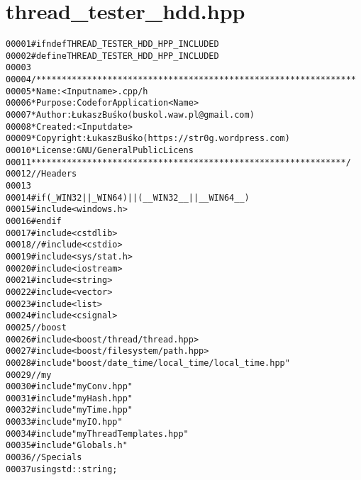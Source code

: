 \hypertarget{thread__tester__hdd_8hpp_source}{
\section{thread\_\-tester\_\-hdd.hpp}
}


\begin{footnotesize}\begin{alltt}
00001 \textcolor{preprocessor}{#ifndef THREAD\_TESTER\_HDD\_HPP\_INCLUDED}
00002 \textcolor{preprocessor}{}\textcolor{preprocessor}{#define THREAD\_TESTER\_HDD\_HPP\_INCLUDED}
00003 \textcolor{preprocessor}{}
00004 \textcolor{comment}{/***************************************************************}
00005 \textcolor{comment}{ * Name:      <Input name>.cpp/h}
00006 \textcolor{comment}{ * Purpose:   Code for Application <Name>}
00007 \textcolor{comment}{ * Author:    Łukasz Buśko (buskol.waw.pl@gmail.com)}
00008 \textcolor{comment}{ * Created:   <Input date>}
00009 \textcolor{comment}{ * Copyright: Łukasz Buśko (https://str0g.wordpress.com)}
00010 \textcolor{comment}{ * License:   GNU / General Public Licens}
00011 \textcolor{comment}{ **************************************************************/}
00012 \textcolor{comment}{//Headers}
00013 
00014 \textcolor{preprocessor}{#if ( \_WIN32 || \_WIN64 ) || ( \_\_WIN32\_\_ || \_\_WIN64\_\_ )}
00015 \textcolor{preprocessor}{}\textcolor{preprocessor}{    #include <windows.h>}
00016 \textcolor{preprocessor}{#endif}
00017 \textcolor{preprocessor}{}\textcolor{preprocessor}{#include <cstdlib>}
00018 \textcolor{comment}{//#include <cstdio>}
00019 \textcolor{preprocessor}{#include <sys/stat.h>}
00020 \textcolor{preprocessor}{#include <iostream>}
00021 \textcolor{preprocessor}{#include <string>}
00022 \textcolor{preprocessor}{#include <vector>}
00023 \textcolor{preprocessor}{#include <list>}
00024 \textcolor{preprocessor}{#include <csignal>}
00025 \textcolor{comment}{//boost}
00026 \textcolor{preprocessor}{#include <boost/thread/thread.hpp>}
00027 \textcolor{preprocessor}{#include <boost/filesystem/path.hpp>}
00028 \textcolor{preprocessor}{#include "boost/date\_time/local\_time/local\_time.hpp"}
00029 \textcolor{comment}{//my}
00030 \textcolor{preprocessor}{#include "myConv.hpp"}
00031 \textcolor{preprocessor}{#include "myHash.hpp"}
00032 \textcolor{preprocessor}{#include "myTime.hpp"}
00033 \textcolor{preprocessor}{#include "myIO.hpp"}
00034 \textcolor{preprocessor}{#include "myThreadTemplates.hpp"}
00035 \textcolor{preprocessor}{#include "Globals.h"}
00036 \textcolor{comment}{//Specials}
00037 \textcolor{keyword}{using} std::string;

\end{alltt}
\end{footnotesize}
